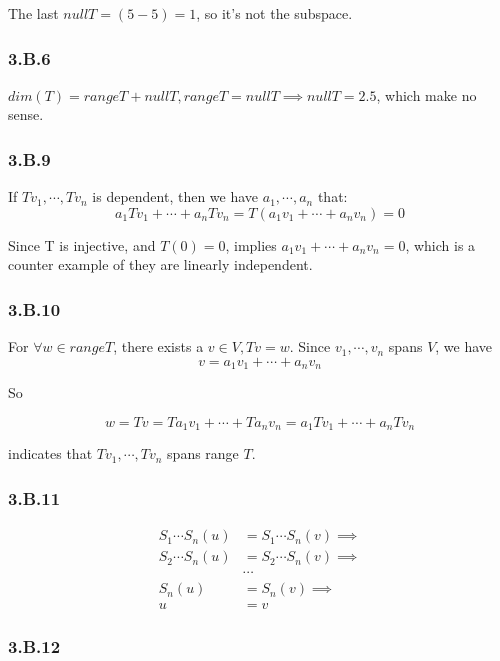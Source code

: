 The last $null T = (5-5) = 1$, so it's not the subspace.

\subsubsection*{3.B.6}

$dim(T) = range T + null T, range T = null T \implies null T = 2.5$, which make no sense.

\subsubsection*{3.B.9}

If $Tv_{1}, \cdots, Tv_{n}$ is dependent, then we have $a_{1}, \cdots, a_{n}$ that:
\[a_{1}Tv_{1} + \cdots +a_{n}Tv_{n} = T(a_{1}v_{1}+\cdots+a_{n}v_{n}) = 0\]

Since T is injective, and $T(0) = 0$, implies $a_{1}v_{1}+\cdots+a_{n}v_{n} = 0$, which is a counter example of they are linearly independent.

\subsubsection*{3.B.10}

For $\forall w\in range T$, there exists a $v\in V, Tv=w$. Since $v_{1}, \cdots, v_{n}$ spans $V$, we have 
\[v = a_{1}v_{1} + \cdots + a_{n}v_{n}\]

So 

\[w = Tv = Ta_{1}v_{1} + \cdots + Ta_{n}v_{n} = a_{1}Tv_{1} + \cdots + a_{n}Tv_{n}\]

indicates that $Tv_{1}, \cdots, Tv_{n}$ spans range $T$.

\subsubsection*{3.B.11}


\begin{equation*}
    \begin{split}
S_{1}\cdots S_{n}(u) &= S_{1}\cdots S_{n}(v) \implies \\
S_{2}\cdots S_{n}(u) &= S_{2}\cdots S_{n}(v) \implies \\
&\cdots \\
S_{n}(u) &= S_{n}(v) \implies \\
u &= v
\end{split}
\end{equation*}

\subsubsection*{3.B.12}

